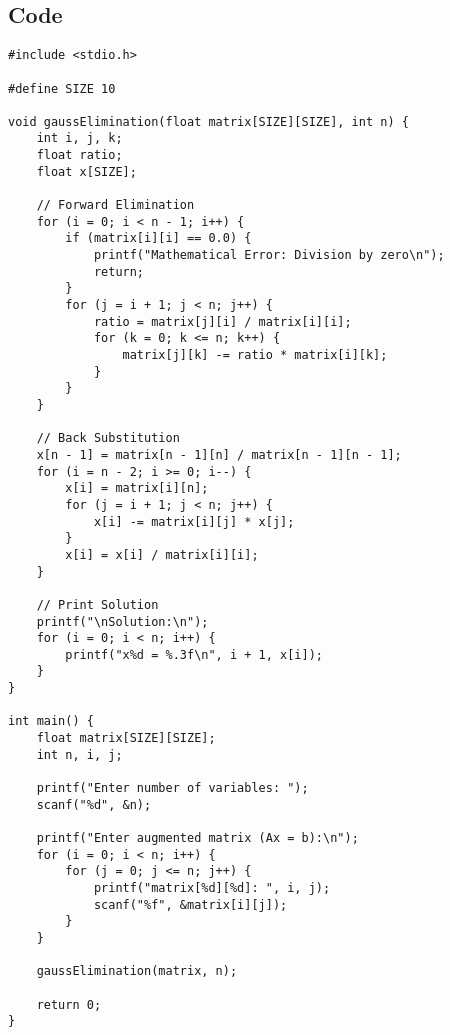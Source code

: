 \documentclass[12pt,a4paper]{article}
\begin{document}
\subsection*{Code}
\begin{lstlisting}
#include <stdio.h>

#define SIZE 10

void gaussElimination(float matrix[SIZE][SIZE], int n) {
    int i, j, k;
    float ratio;
    float x[SIZE];

    // Forward Elimination
    for (i = 0; i < n - 1; i++) {
        if (matrix[i][i] == 0.0) {
            printf("Mathematical Error: Division by zero\n");
            return;
        }
        for (j = i + 1; j < n; j++) {
            ratio = matrix[j][i] / matrix[i][i];
            for (k = 0; k <= n; k++) {
                matrix[j][k] -= ratio * matrix[i][k];
            }
        }
    }

    // Back Substitution
    x[n - 1] = matrix[n - 1][n] / matrix[n - 1][n - 1];
    for (i = n - 2; i >= 0; i--) {
        x[i] = matrix[i][n];
        for (j = i + 1; j < n; j++) {
            x[i] -= matrix[i][j] * x[j];
        }
        x[i] = x[i] / matrix[i][i];
    }

    // Print Solution
    printf("\nSolution:\n");
    for (i = 0; i < n; i++) {
        printf("x%d = %.3f\n", i + 1, x[i]);
    }
}

int main() {
    float matrix[SIZE][SIZE];
    int n, i, j;

    printf("Enter number of variables: ");
    scanf("%d", &n);

    printf("Enter augmented matrix (Ax = b):\n");
    for (i = 0; i < n; i++) {
        for (j = 0; j <= n; j++) {
            printf("matrix[%d][%d]: ", i, j);
            scanf("%f", &matrix[i][j]);
        }
    }

    gaussElimination(matrix, n);

    return 0;
}
\end{lstlisting}
\end{document}
